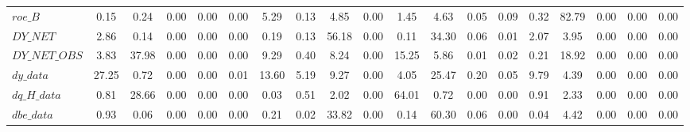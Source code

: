 \begin{center}
\begin{longtable}{lcccccccccccccccccc}
$roe\_B             $	 & 	             0.15	 & 	             0.24	 & 	             0.00	 & 	             0.00	 & 	             0.00	 & 	             5.29	 & 	             0.13	 & 	             4.85	 & 	             0.00	 & 	             1.45	 & 	             4.63	 & 	             0.05	 & 	             0.09	 & 	             0.32	 & 	            82.79	 & 	             0.00	 & 	             0.00	 & 	             0.00 \\ 
$DY\_NET            $	 & 	             2.86	 & 	             0.14	 & 	             0.00	 & 	             0.00	 & 	             0.00	 & 	             0.19	 & 	             0.13	 & 	            56.18	 & 	             0.00	 & 	             0.11	 & 	            34.30	 & 	             0.06	 & 	             0.01	 & 	             2.07	 & 	             3.95	 & 	             0.00	 & 	             0.00	 & 	             0.00 \\ 
$DY\_NET\_OBS       $	 & 	             3.83	 & 	            37.98	 & 	             0.00	 & 	             0.00	 & 	             0.00	 & 	             9.29	 & 	             0.40	 & 	             8.24	 & 	             0.00	 & 	            15.25	 & 	             5.86	 & 	             0.01	 & 	             0.02	 & 	             0.21	 & 	            18.92	 & 	             0.00	 & 	             0.00	 & 	             0.00 \\ 
$dy\_data           $	 & 	            27.25	 & 	             0.72	 & 	             0.00	 & 	             0.00	 & 	             0.01	 & 	            13.60	 & 	             5.19	 & 	             9.27	 & 	             0.00	 & 	             4.05	 & 	            25.47	 & 	             0.20	 & 	             0.05	 & 	             9.79	 & 	             4.39	 & 	             0.00	 & 	             0.00	 & 	             0.00 \\ 
$dq\_H\_data        $	 & 	             0.81	 & 	            28.66	 & 	             0.00	 & 	             0.00	 & 	             0.00	 & 	             0.03	 & 	             0.51	 & 	             2.02	 & 	             0.00	 & 	            64.01	 & 	             0.72	 & 	             0.00	 & 	             0.00	 & 	             0.91	 & 	             2.33	 & 	             0.00	 & 	             0.00	 & 	             0.00 \\ 
$dbe\_data          $	 & 	             0.93	 & 	             0.06	 & 	             0.00	 & 	             0.00	 & 	             0.00	 & 	             0.21	 & 	             0.02	 & 	            33.82	 & 	             0.00	 & 	             0.14	 & 	            60.30	 & 	             0.06	 & 	             0.00	 & 	             0.04	 & 	             4.42	 & 	             0.00	 & 	             0.00	 & 	             0.00 \\ 

\end{longtable}
\end{center}
